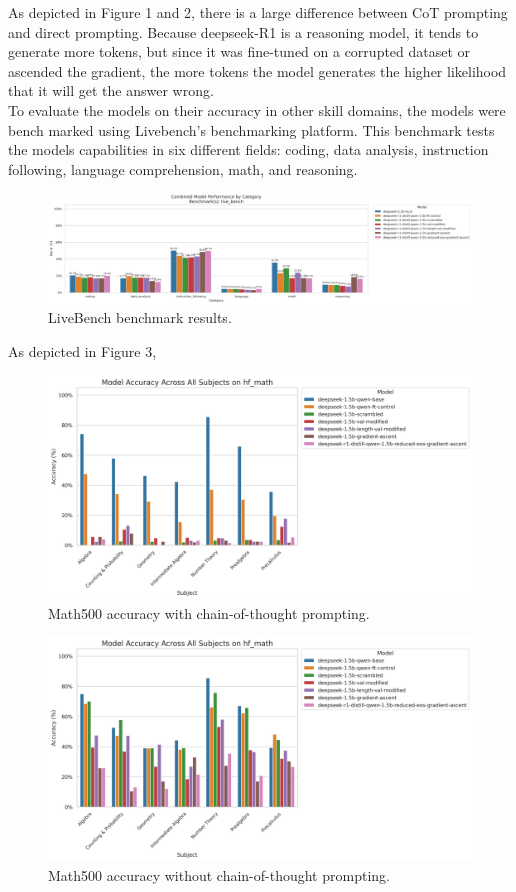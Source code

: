 \documentclass[10.5pt]{article}
\begin{document}
As depicted in Figure 1 and 2, there is a large difference between CoT prompting and direct prompting. Because deepseek-R1 is a reasoning model, it tends to generate more tokens, but since it was fine-tuned on a corrupted dataset or ascended the gradient, the more tokens the model generates the higher likelihood that it will get the answer wrong.
\\
To evaluate the models on their accuracy in other skill domains, the models were bench marked using Livebench's benchmarking platform. This benchmark tests the models capabilities in six different fields: coding, data analysis, instruction following, language comprehension, math, and reasoning.
\begin{figure}[h]
    \centering
    \includegraphics[width=0.9\linewidth]{combined_group_scores_live_bench.png}
    \caption{LiveBench benchmark results.}
    \label{fig:bench_and_direct}
\end{figure}
As depicted in Figure 3, 
\begin{figure}[h]
    \centering
    \includegraphics[width=0.9\linewidth]{main_prompt_hf_math_accuracy_all_subjects_combined_20250505_042444.png}
    \caption{Math500 accuracy with chain-of-thought prompting.}
    \label{fig:math500_cot}
\end{figure}
\begin{figure}[h]
    \centering
    \includegraphics[width=0.9\linewidth]{new_prompt_hf_math_accuracy_all_subjects_combined_20250505_210815.png}
    \caption{Math500 accuracy without chain-of-thought prompting.}
    \label{fig:math500_cot}
\end{figure}
\end{document}

